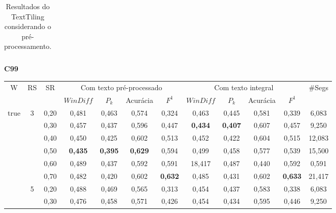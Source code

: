 \documentclass{article}
\begin{document}
\begin{table}[!h]
\begin{tabular}{|c|c||c|c|c|c|c||c|c|c|c|c|}
 \end{tabular}  
\caption{Resultados do TextTiling considerando o pré-processamento.}
\end{table} 

 \newpage



\begin{table}[!h]
	\center
	\textbf{C99}  \\
	\begin{tabular}{|c|c|c||c|c|c|c||c|c|c|c||c|} 
\hline 
\multirow{2}{*}{W} & \multirow{2}{*}{RS} & \multirow{2}{*}{SR} & \multicolumn{4}{c||}{Com texto pré-processado} & \multicolumn{4}{c||}{Com texto integral}& \multirow{2}{*}{\#Segs} \\\cline{4-11}

&& & $WinDiff$ & $P_k$ & Acurácia & $F^1$ & $WinDiff$ & $P_k$ & Acurácia & $F^1$ & \\ \hline 
 \multirow{18}{*}{true} & \multirow{6}{*}{3} 
	 & 0,20    & 0,481 & 0,463 & 0,574 & 0,324         &     0,463 &  0,445 & 0,581 & 0,339 & 6,083                \\ \cline{3-12}
	&& 0,30    & 0,457 & 0,437 & 0,596 & 0,447         &     \cellcolor{gray!20} \textbf{0,434} & \cellcolor{gray!20} \textbf{0,407} & 0,607 & 0,457 & 9,250  \\\cline{3-12} 
	&& 0,40    & 0,450 & 0,425 & 0,602 & 0,513         &     0,452 &  0,422 & 0,604 & 0,515 & 12,083              \\ \cline{3-12}                                            
	&& 0,50    & \cellcolor{gray!20} \textbf{0,435} & \cellcolor{gray!20} \textbf{0,395} & \cellcolor{gray!20} \textbf{0,629} & 0,594  &     0,499 &  0,458 & 0,577 & 0,539 & 15,500              \\ \cline{3-12}
	&& 0,60    & 0,489 & 0,437 & 0,592 & 0,591 & 18,417                                &     0,487 &  0,440 & 0,592 & 0,591               \\ \cline{3-12}                 
	&& 0,70    & 0,482 & 0,420 & 0,602 & \cellcolor{gray!20} \textbf{0,632} &    0,485 &  0,431 & 0,602 & \cellcolor{gray!20} \textbf{0,633} & 21,417 \\ \cline{2-12} 
 & \multirow{6}{*}{5} 
	  & 0,20    & 0,488 & 0,469 & 0,565 & 0,313         &     0,454 &  0,437 & 0,583 & 0,338 & 6,083               \\ \cline{3-12}                  
	 && 0,30    & 0,476 & 0,458 & 0,571 & 0,426         &     0,454 &  0,434 & 0,595 & 0,446 & 9,250               \\ \cline{3-12}                  

\end{tabular}
\end{table}
\end{document}
